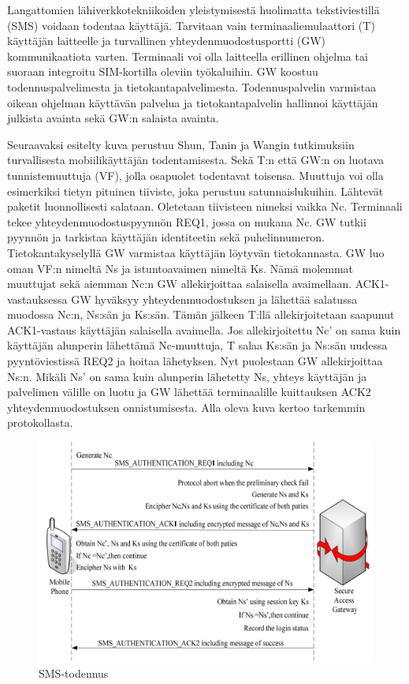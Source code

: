 \documentclass[finnish]{tktltiki2}
\theoremstyle{definition}
\theoremstyle{remark}
\begin{document}
Langattomien lähiverkkotekniikoiden yleistymisestä huolimatta tekstiviestillä (SMS) voidaan todentaa käyttäjä. Tarvitaan vain terminaaliemulaattori (T) käyttäjän laitteelle ja turvallinen yhteydenmuodostusportti (GW) kommunikaatiota varten. Terminaali voi olla laitteella erillinen ohjelma tai suoraan integroitu SIM-kortilla oleviin työkaluihin. GW koostuu todennuspalvelimesta ja tietokantapalvelimesta. Todennuspalvelin varmistaa oikean ohjelman käyttävän palvelua ja tietokantapalvelin hallinnoi käyttäjän julkista avainta sekä GW:n salaista avainta.

Seuraavaksi esitelty kuva perustuu Shun, Tanin ja Wangin \cite{sms} tutkimuksiin turvallisesta mobiilikäyttäjän todentamisesta. Sekä T:n että GW:n on luotava tunnistemuuttuja (VF), jolla osapuolet todentavat toisensa. Muuttuja voi olla esimerkiksi tietyn pituinen tiiviste, joka perustuu satunnaislukuihin. Lähtevät paketit luonnollisesti salataan. Oletetaan tiivisteen nimeksi vaikka Nc. Terminaali tekee yhteydenmuodostuspyynnön REQ1, jossa on mukana Nc. GW tutkii pyynnön ja tarkistaa käyttäjän identiteetin sekä puhelinnumeron. Tietokantakyselyllä GW varmistaa käyttäjän löytyvän tietokannasta. GW luo oman VF:n nimeltä Ns ja istuntoavaimen nimeltä Ks. Nämä molemmat muuttujat sekä aiemman Nc:n GW allekirjoittaa salaisella avaimellaan. ACK1-vastauksessa GW hyväksyy yhteydenmuodostuksen ja lähettää salatussa muodossa Nc:n, Ns:sän ja Ks:sän. Tämän jälkeen T:llä allekirjoitetaan saapunut ACK1-vastaus käyttäjän salaisella avaimella. Jos allekirjoitettu Nc' on sama kuin käyttäjän alunperin lähettämä Nc-muuttuja, T salaa Ks:sän ja Ns:sän uudessa pyyntöviestissä REQ2 ja hoitaa lähetyksen. Nyt puolestaan GW allekirjoittaa Ns:n. Mikäli Ns' on sama kuin alunperin lähetetty Ns, yhteys käyttäjän ja palvelimen välille on luotu ja GW lähettää terminaalille kuittauksen ACK2 yhteydenmuodostuksen onnistumisesta. Alla oleva kuva kertoo tarkemmin protokollasta.   

\begin{figure}[h!]
\centering
	\includegraphics[scale=0.4]{sms-todennus}
\caption{SMS-todennus \cite{sms}}
\end{figure}
\end{document}
